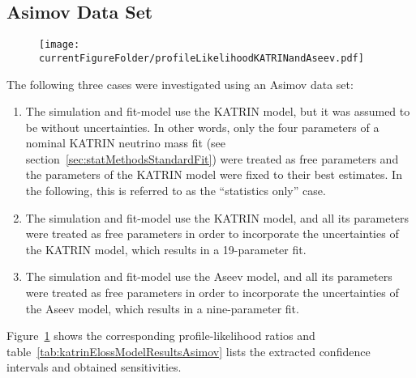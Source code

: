 \subsection{Asimov Data Set}
\label{sec:katrinElossModelResultsAsimov}
\begin{figure}[t]
	\centering
	\texttt{[image: \\currentFigureFolder/profileLikelihoodKATRINandAseev.pdf]}
	\label{fig:katrinElossResultsProfileLikelihood}
\end{figure}
The following three cases were investigated using an Asimov data set:
\begin{enumerate}
	\item The simulation and fit-model use the KATRIN model, but it was assumed to be without uncertainties. In other words, only the four parameters of a nominal KATRIN neutrino mass fit (see section~\ref{sec:statMethodsStandardFit}) were treated as free parameters and the parameters of the KATRIN model were fixed to their best estimates. In the following, this is referred to as the ``statistics only'' case.
	\item The simulation and fit-model use the KATRIN model, and all its parameters were treated as free parameters  in order to incorporate the uncertainties of the KATRIN model, which results in a 19-parameter fit.
	\item The simulation and fit-model use the Aseev model, and all its parameters were treated as free parameters in order to incorporate the uncertainties of the Aseev model, which results in a nine-parameter fit.
\end{enumerate}
Figure~\ref{fig:katrinElossResultsProfileLikelihood} shows the corresponding profile-likelihood ratios and table~\ref{tab:katrinElossModelResultsAsimov} lists the extracted confidence intervals and obtained sensitivities.

